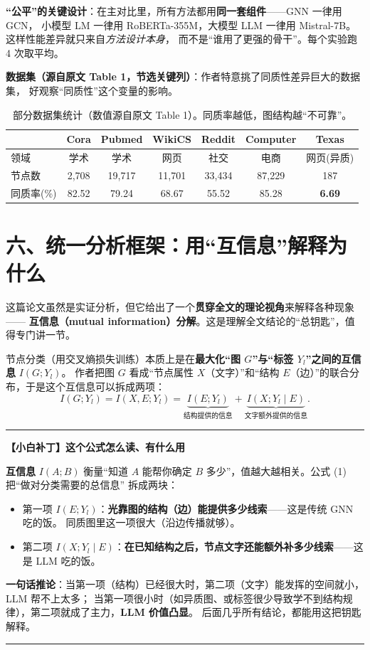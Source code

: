 \documentclass[11pt,UTF8,fontset=fandol]{ctexart}
\newenvironment{tip}[1]{%
  \par\smallskip\noindent\rule{\linewidth}{0.4pt}\par\nobreak
  \noindent\textbf{【小白补丁】#1}\par\nobreak\noindent\ignorespaces
}{%
  \par\noindent\rule{\linewidth}{0.4pt}\par\smallskip
}
\begin{document}
\textbf{“公平”的关键设计}：在主对比里，所有方法都用\textbf{同一套组件}——GNN 一律用 GCN，
小模型 LM 一律用 RoBERTa-355M，大模型 LLM 一律用 Mistral-7B。这样性能差异就只来自\emph{方法设计本身}，
而不是“谁用了更强的骨干”。每个实验跑 4 次取平均。

\textbf{数据集（源自原文 Table 1，节选关键列）}：作者特意挑了同质性差异巨大的数据集，
好观察“同质性”这个变量的影响。

\begin{table}[H]\centering
\caption{部分数据集统计（数值源自原文 Table 1）。同质率越低，图结构越“不可靠”。}
\begin{tabular}{lcccccc}
\toprule
 & \textbf{Cora} & \textbf{Pubmed} & \textbf{WikiCS} & \textbf{Reddit} & \textbf{Computer} & \textbf{Texas} \\
\midrule
领域 & 学术 & 学术 & 网页 & 社交 & 电商 & 网页(异质) \\
节点数 & 2{,}708 & 19{,}717 & 11{,}701 & 33{,}434 & 87{,}229 & 187 \\
同质率(\%) & 82.52 & 79.24 & 68.67 & 55.52 & 85.28 & \textbf{6.69} \\
\bottomrule
\end{tabular}
\end{table}

\section{六、统一分析框架：用“互信息”解释为什么}

这篇论文虽然是实证分析，但它给出了一个\textbf{贯穿全文的理论视角}来解释各种现象——
\textbf{互信息（mutual information）分解}。这是理解全文结论的“总钥匙”，值得专门讲一节。

节点分类（用交叉熵损失训练）本质上是在\textbf{最大化“图 $G$”与“标签 $Y_l$”之间的互信息} $I(G;Y_l)$。
作者把图 $G$ 看成“节点属性 $X$（文字）”和“结构 $E$（边）”的联合分布，于是这个互信息可以拆成两项：
\begin{equation*}
  I(G;Y_l)=I(X,E;Y_l)=\underbrace{I(E;Y_l)}_{\text{结构提供的信息}}
  +\underbrace{I(X;Y_l\mid E)}_{\text{文字额外提供的信息}}. \tag{1}
\end{equation*}

\begin{tip}{这个公式怎么读、有什么用}
\textbf{互信息} $I(A;B)$ 衡量“知道 $A$ 能帮你确定 $B$ 多少”，值越大越相关。公式 (1) 把“做对分类需要的总信息”
拆成两块：
\begin{itemize}[leftmargin=1.4em]
  \item 第一项 $I(E;Y_l)$：\textbf{光靠图的结构（边）能提供多少线索}——这是传统 GNN 吃的饭。
        同质图里这一项很大（沿边传播就够）。
  \item 第二项 $I(X;Y_l\mid E)$：\textbf{在已知结构之后，节点文字还能额外补多少线索}——这是 LLM 吃的饭。
\end{itemize}
\textbf{一句话推论}：当第一项（结构）已经很大时，第二项（文字）能发挥的空间就小，LLM 帮不上太多；
当第一项很小时（如异质图、或标签很少导致学不到结构规律），第二项就成了主力，\textbf{LLM 价值凸显}。
后面几乎所有结论，都能用这把钥匙解释。
\end{tip}
\end{document}
